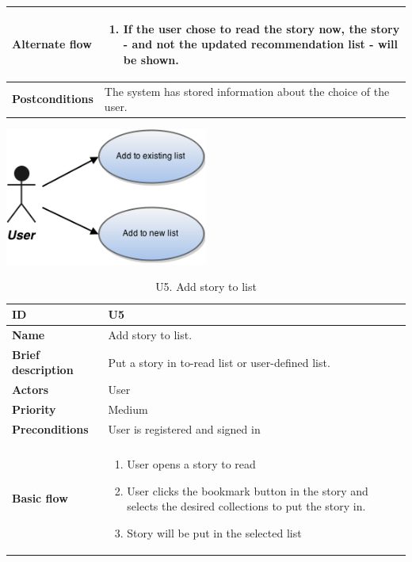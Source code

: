 \begin{table}[htp]
\begin{tabular}[b]{|l | l|}
		\textbf{Alternate flow}		& \begin{minipage}{5in}
			\begin{enumerate}[noitemsep]
				\item If the user chose to read the story now, the story - and not the updated recommendation list - will be shown.
			\end{enumerate}
		\end{minipage}							\\\hline
		\textbf{Postconditions}		& The system has stored information about the choice of the user.\\\hline
	\end{tabular}
\end{table}

\begin{table}[htp]
	\includegraphics[width=0.5\textwidth]{fig/U5}
	\centering
	\caption{U5. Add story to list}
	\begin{tabular}[b]{|l | l|}\hline
		\textbf{ID} 				& U5									\\\hline
		\textbf{Name} 				& Add story to list.					\\\hline
		\textbf{Brief description}	& Put a story in to-read list or user-defined  list. 		\\\hline
		\textbf{Actors} 			& User									\\\hline
		\textbf{Priority}			& Medium								\\\hline
		\textbf{Preconditions}		& User is registered and signed in		\\\hline&\\[-2ex]
		\textbf{Basic flow}			& \begin{minipage}{5in}
			\begin{enumerate}[noitemsep]
				\item User opens a story to read
				\item User clicks the bookmark button in the story and selects the desired collections to put the story in.
				\item Story will be put in the selected list
			\end{enumerate}						

\end{minipage}
\end{tabular}
\end{table}
